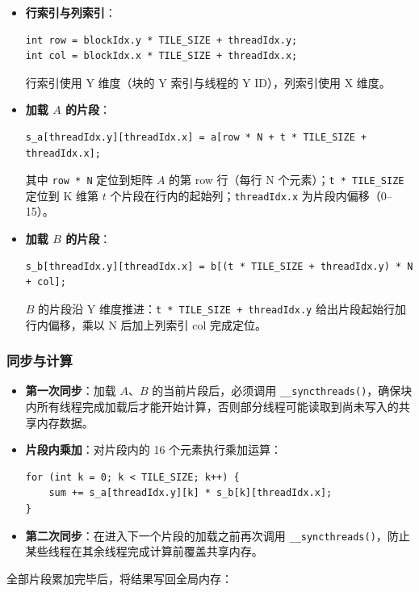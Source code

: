 \begin{itemize}
    \item \textbf{行索引与列索引}：
    \begin{lstlisting}
int row = blockIdx.y * TILE_SIZE + threadIdx.y;
int col = blockIdx.x * TILE_SIZE + threadIdx.x;
    \end{lstlisting}
    行索引使用 Y 维度（块的 Y 索引与线程的 Y ID），列索引使用 X 维度。

    \item \textbf{加载 $A$ 的片段}：
    \begin{lstlisting}
s_a[threadIdx.y][threadIdx.x] = a[row * N + t * TILE_SIZE + threadIdx.x];
    \end{lstlisting}
    其中 \texttt{row * N} 定位到矩阵 $A$ 的第 row 行（每行 N 个元素）；\texttt{t * TILE\_SIZE} 定位到 K 维第 $t$ 个片段在行内的起始列；\texttt{threadIdx.x} 为片段内偏移（0--15）。

    \item \textbf{加载 $B$ 的片段}：
    \begin{lstlisting}
s_b[threadIdx.y][threadIdx.x] = b[(t * TILE_SIZE + threadIdx.y) * N + col];
    \end{lstlisting}
    $B$ 的片段沿 Y 维度推进：\texttt{t * TILE\_SIZE + threadIdx.y} 给出片段起始行加行内偏移，乘以 N 后加上列索引 col 完成定位。
\end{itemize}

\subsubsection{同步与计算}

\begin{itemize}
    \item \textbf{第一次同步}：加载 $A$、$B$ 的当前片段后，必须调用 \texttt{\_\_syncthreads()}，确保块内所有线程完成加载后才能开始计算，否则部分线程可能读取到尚未写入的共享内存数据。
    \item \textbf{片段内乘加}：对片段内的 16 个元素执行乘加运算：
    \begin{lstlisting}
for (int k = 0; k < TILE_SIZE; k++) {
    sum += s_a[threadIdx.y][k] * s_b[k][threadIdx.x];
}
    \end{lstlisting}
    \item \textbf{第二次同步}：在进入下一个片段的加载之前再次调用 \texttt{\_\_syncthreads()}，防止某些线程在其余线程完成计算前覆盖共享内存。
\end{itemize}

全部片段累加完毕后，将结果写回全局内存：

